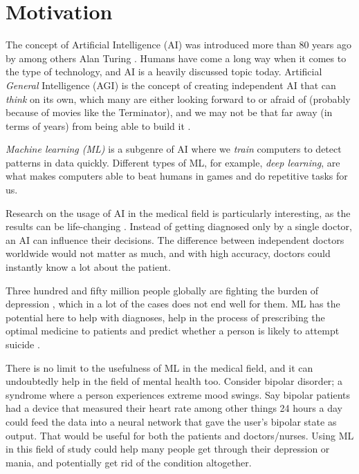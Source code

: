 \section{Motivation}

The concept of Artificial Intelligence (AI) was introduced more than 80 years ago by among others Alan Turing \cite{turing1938}. Humans have come a long way when it comes to the type of technology, and AI is a heavily discussed topic today. Artificial \textit{General} Intelligence (AGI) is the concept of creating independent AI that can \textit{think} on its own, which many are either looking forward to or afraid of (probably because of movies like the Terminator), and we may not be that far away (in terms of years) from being able to build it \cite{peter_morgan_2019}. 

\textit{Machine learning (ML)} is a subgenre of AI where we \textit{train} computers to detect patterns in data quickly. Different types of ML, for example, \textit{deep learning}, are what makes computers able to beat humans in games and do repetitive tasks for us. 

Research on the usage of AI in the medical field is particularly interesting, as the results can be life-changing \cite{topol2019}. Instead of getting diagnosed only by a single doctor, an AI can influence their decisions. The difference between independent doctors worldwide would not matter as much, and with high accuracy, doctors could instantly know a lot about the patient. 

Three hundred and fifty million people globally are fighting the burden of depression \cite{burden_of_depression}, which in a lot of the cases does not end well for them. ML has the potential here to help with diagnoses, help in the process of prescribing the optimal medicine to patients and predict whether a person is likely to attempt suicide \cite{topol2019}. 

There is no limit to the usefulness of ML in the medical field, and it can undoubtedly help in the field of mental health too. Consider bipolar disorder; a syndrome where a person experiences extreme mood swings. Say bipolar patients had a device that measured their heart rate among other things 24 hours a day could feed the data into a neural network that gave the user's bipolar state as output. That would be useful for both the patients and doctors/nurses. Using ML in this field of study could help many people get through their depression or mania, and potentially get rid of the condition altogether.

